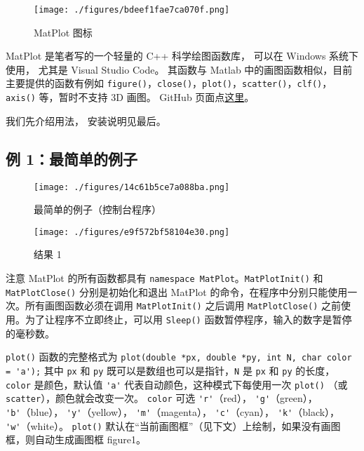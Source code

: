 
\begin{figure}[ht]
\centering
\texttt{[image: ./figures/bdeef1fae7ca070f.png]}
\caption{MatPlot 图标} \label{fig_MtPlot_1}
\end{figure}

MatPlot 是笔者写的一个轻量的 C++ 科学绘图函数库， 可以在 Windows 系统下使用， 尤其是 Visual Studio Code。 其函数与 Matlab 中的画图函数相似，目前主要提供的函数有例如 \verb|figure()|，\verb|close()|，\verb|plot()|，\verb|scatter()|，\verb|clf()|，\verb|axis()| 等，暂时不支持 3D 画图。 GitHub 页面点\href{https://github.com/MacroUniverse/MatPlot}{这里}。

我们先介绍用法， 安装说明见最后。

\subsection{例 1：最简单的例子}

\begin{figure}[ht]
\centering
\texttt{[image: ./figures/14c61b5ce7a088ba.png]}
\caption{最简单的例子（控制台程序）} \label{fig_MtPlot_2}
\end{figure}

\begin{figure}[ht]
\centering
\texttt{[image: ./figures/e9f572bf58104e30.png]}
\caption{结果 1} \label{fig_MtPlot_3}
\end{figure}

注意 MatPlot 的所有函数都具有 \verb|namespace MatPlot|。\verb|MatPlotInit()| 和 \verb|MatPlotClose()| 分别是初始化和退出 MatPlot 的命令，在程序中分别只能使用一次。所有画图函数必须在调用 \verb|MatPlotInit()| 之后调用 \verb|MatPlotClose()| 之前使用。为了让程序不立即终止，可以用 \verb|Sleep()| 函数暂停程序，输入的数字是暂停的毫秒数。

\verb|plot()| 函数的完整格式为
\verb|plot(double *px, double *py, int N, char color = 'a');|
其中 \verb|px| 和 \verb|py| 既可以是数组也可以是指针，\verb|N| 是 \verb|px| 和 \verb|py| 的长度，\verb|color| 是颜色，默认值 \verb|'a'| 代表自动颜色，这种模式下每使用一次 \verb|plot()| （或 \verb|scatter|），颜色就会改变一次。 \verb|color| 可选
\verb|'r'|（red），
\verb|'g'|（green），
\verb|'b'|（blue），
\verb|'y'|（yellow），
\verb|'m'|（magenta），
\verb|'c'|（cyan），
\verb|'k'|（black），
\verb|'w'|（white）。
\verb|plot()| 默认在“当前画图框”（见下文）上绘制，如果没有画图框，则自动生成画图框 figure1。

